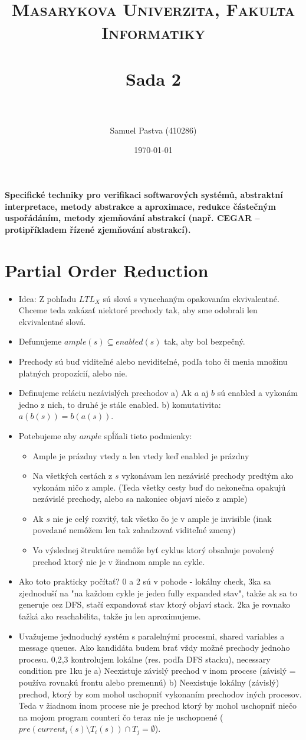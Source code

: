 \documentclass[paper=a4, fontsize=11pt]{scrartcl} %
\title{	
	\normalfont \normalsize 
	\textsc{Masarykova Univerzita, Fakulta Informatiky} \\ [25pt] %
	\horrule{0.5pt} \\[0.4cm] %
	\huge Sada 2 \\ %
	\horrule{2pt} \\[0.5cm] %
}
\author{Samuel Pastva (410286)} %
\date{\normalsize\today} %
\numberwithin{equation}{section} %
\numberwithin{figure}{section} %
\numberwithin{table}{section} %
\begin{document}
	
	\textbf{Specifické techniky pro verifikaci softwarových systémů, abstraktní interpretace, metody abstrakce a aproximace, redukce částečným uspořádáním, metody zjemňování abstrakcí (např. CEGAR – protipříkladem řízené zjemňování abstrakcí).}
	
	\section{Partial Order Reduction}
	
	\begin{itemize}
		\item Idea: Z pohľadu $LTL_X$ sú slová s vynechaným opakovaním ekvivalentné. Chceme teda zakázať niektoré prechody tak, aby sme odobrali len ekvivalentné slová.
		\item Defunujeme $ample(s) \subseteq enabled(s)$ tak, aby bol bezpečný.
		\item Prechody sú buď viditeľné alebo neviditeľné, podľa toho či menia množinu platných propozícií, alebo nie.
		\item Definujeme reláciu nezávislých prechodov a) Ak $a$ aj $b$ sú enabled a vykonám jedno z nich, to druhé je stále enabled. b) komutativita: $a(b(s)) = b(a(s))$.
		\item Potebujeme aby $ample$ spĺňali tieto podmienky: 
		
		\begin{itemize}
			\item Ample je prázdny vtedy a len vtedy keď enabled je prázdny
			\item Na všetkých cestách z $s$ vykonávam len nezávislé prechody predtým ako vykonám ničo z ample. (Teda všetky cesty buď do nekonečna opakujú nezávislé prechody, alebo sa nakoniec objaví niečo z ample)
			\item Ak $s$ nie je celý rozvitý, tak všetko čo je v ample je invisible (inak povedané nemôžem len tak zahadzovať viditeľné zmeny)
			\item Vo výslednej štruktúre nemôže byť cyklus ktorý obsahuje povolený prechod ktorý nie je v žiadnom ample na cykle.
		\end{itemize}
	
		\item Ako toto prakticky počítať? 0 a 2 sú v pohode - lokálny check, 3ka sa zjednoduší na "na každom cykle je jeden fully expanded stav", takže ak sa to generuje cez DFS, stačí expandovať stav ktorý objaví stack. 2ka je rovnako ťažká ako reachabilita, takže ju len aproximujeme.
		
		\item Uvažujeme jednoduchý systém s paralelnými procesmi, shared variables a message queues. Ako kandidáta budem brať vždy možné prechody jednoho procesu. 0,2,3 kontrolujem lokálne (res. podľa DFS stacku), necessary condition pre 1ku je a) Neexistuje závislý prechod v inom procese (závislý = používa rovnakú frontu alebo premennú) b) Neexistuje lokálny (závislý) prechod, ktorý by som mohol uschopniť vykonaním prechodov iných procesov. Teda v žiadnom inom procese nie je prechod ktorý by mohol uschopniť niečo na mojom program counteri čo teraz nie je uschopnené ($pre(current_i(s) \setminus T_i(s)) \cap T_j = \emptyset$).
	\end{itemize}
\end{document}
